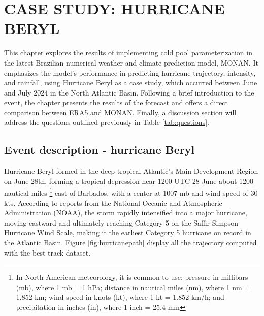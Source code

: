 
\chapter{CASE STUDY: HURRICANE BERYL}
\label{ch:beryl}

This chapter explores the results of implementing cold pool parameterization in the latest Brazilian numerical weather and climate prediction model, MONAN. It emphasizes the model's performance in predicting hurricane trajectory, intensity, and rainfall, using Hurricane Beryl as a case study, which occurred between June and July 2024 in the North Atlantic Basin. Following a brief introduction to the event, the chapter presents the results of the forecast and offers a direct comparison between ERA5 and MONAN. Finally, a discussion section will address the questions outlined previously in Table \ref{tab:questions}.

\section{Event description - hurricane Beryl}

Hurricane Beryl formed in the deep tropical Atlantic’s Main Development Region on June 28th, forming a tropical depression near 1200 UTC 28 June about 1200 nautical miles \footnote{In North American meteorology, it is common to use: pressure in millibars (mb), where 1 mb = 1 hPa; distance in nautical miles (nm), where 1 nm = 1.852 km; wind speed in knots (kt), where 1 kt = 1.852 km/h; and precipitation in inches (in), where 1 inch = 25.4 mm} east of Barbados, with a center at 1007 mb and wind speed of 30 kts. According to reports from the National Oceanic and Atmospheric Administration (NOAA), the storm rapidly intensified into a major hurricane, moving eastward and ultimately reaching Category 5 on the Saffir-Simpson Hurricane Wind Scale, making it the earliest Category 5 hurricane on record in the Atlantic Basin. Figure \ref{fig:hurricanepath} display all the trajectory computed with the best track dataset.

